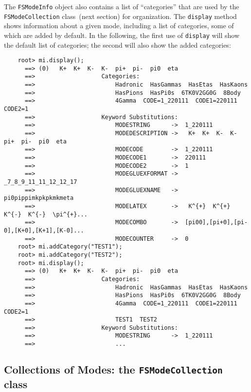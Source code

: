 \documentclass[11pt]{article}
\begin{document}
The {\tt FSModeInfo} object also contains a list of ``categories'' that are used by the {\tt FSModeCollection} class~(next section) for organization.  The {\tt display} method shows information about a given mode, including a list of categories, some of which are added by default.  In the following, the first use of {\tt display} will show the default list of categories; the second will also show the added categories:
\begin{verbatim}
    root> mi.display();
      ==> (0)   K+  K+  K-  K-  pi+  pi-  pi0  eta 
      ==>                   Categories:
      ==>                       Hadronic  HasGammas  HasEtas  HasKaons  
      ==>                       HasPions  HasPi0s  6TK0V2GG0G  8Body  
      ==>                       4Gamma  CODE=1_220111  CODE1=220111  CODE2=1  
      ==>                   Keyword Substitutions:
      ==>                       MODESTRING      ->  1_220111     
      ==>                       MODEDESCRIPTION ->   K+  K+  K-  K-  pi+  pi-  pi0  eta 
      ==>                       MODECODE        ->  1_220111       
      ==>                       MODECODE1       ->  220111      
      ==>                       MODECODE2       ->  1      
      ==>                       MODEGLUEXFORMAT ->  _7_8_9_11_11_12_12_17
      ==>                       MODEGLUEXNAME   ->  pi0pippimkpkpkmkmeta  
      ==>                       MODELATEX       ->   K^{+}  K^{+}  K^{-}  K^{-}  \pi^{+}...        
      ==>                       MODECOMBO       ->  [pi00],[pi+0],[pi-0],[K+0],[K+1],[K-0]...      
      ==>                       MODECOUNTER     ->  0  
    root> mi.addCategory("TEST1");
    root> mi.addCategory("TEST2");
    root> mi.display();
      ==> (0)   K+  K+  K-  K-  pi+  pi-  pi0  eta 
      ==>                   Categories:
      ==>                       Hadronic  HasGammas  HasEtas  HasKaons  
      ==>                       HasPions  HasPi0s  6TK0V2GG0G  8Body  
      ==>                       4Gamma  CODE=1_220111  CODE1=220111  CODE2=1  
      ==>                       TEST1  TEST2  
      ==>                   Keyword Substitutions:
      ==>                       MODESTRING      ->  1_220111 
      ==>                       ...
\end{verbatim}

\subsection{Collections of Modes: the {\tt FSModeCollection} class}
\label{sec:modecollection}
\end{document}
